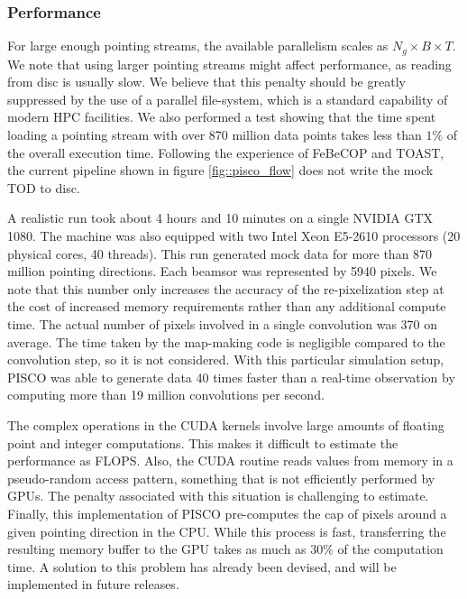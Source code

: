 \documentclass[a4paper,11pt]{article}
\begin{document}
\subsubsection{Performance}

For large enough pointing streams, the available parallelism scales as $N_g \times B \times T$. We note that using larger pointing streams might affect performance, as reading from disc is usually slow. We believe that this penalty should be greatly suppressed by the use of a parallel file-system, which is a standard capability of modern HPC facilities. We also performed a test showing that the time spent loading a pointing stream with over 870 million data points takes less than $1\%$ of the overall execution time. Following the experience of FeBeCOP and TOAST, the current pipeline shown in figure \ref{fig::pisco_flow} does not write the mock TOD to disc.

A realistic run took about 4 hours and 10 minutes on a single NVIDIA GTX 1080. The machine was also equipped with two Intel Xeon E5-2610 processors (20 physical cores, 40 threads). This run generated mock data for more than 870 million pointing directions. Each beamsor was represented by 5940 pixels. We note that this number only increases the accuracy of the re-pixelization step at the cost of increased memory requirements rather than any additional compute time. The actual number of pixels involved in a single convolution was 370 on average. The time taken by the map-making code is negligible compared to the convolution step, so it is not considered. With this particular simulation setup, PISCO was able to generate data 40 times faster than a real-time observation by computing more than 19 million convolutions per second. 

The complex operations in the CUDA kernels involve large amounts of floating point and integer computations. This makes it difficult to estimate the performance as FLOPS. Also, the CUDA routine reads values from memory in a pseudo-random access pattern, something that is not efficiently performed by GPUs. The penalty associated with this situation is challenging to estimate. Finally, this implementation of PISCO pre-computes the cap of pixels around a given pointing direction in the CPU. While this process is fast, transferring the resulting memory buffer to the GPU takes as much as $30\%$ of the computation time. A solution to this problem has already been devised, and will be implemented in future releases.
\end{document}
